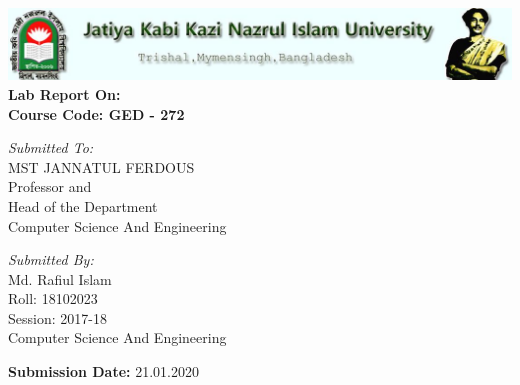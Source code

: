 \documentclass[12pt,a4paper]{report}
\begin{document}
	\begin{center}
		\includegraphics[width=\linewidth]{JKKNIU} \\
		\vspace{1cm}
		\large{ \textbf{Lab Report On: \\
				\color{blue}{Technical Writing And Presentation \\}
				\vspace{8mm}
				\color{black}Course Code: GED - 272}}
	\end{center}
	\vspace{8cm}
	\begin{minipage}{0.5\textwidth} 
		\huge{\textit{Submitted To: }} \\
		\large{MST JANNATUL FERDOUS} \\
		Professor and \\ Head of the Department \\
		Computer Science And Engineering
	\end{minipage}
	\begin{minipage}{0.5\textwidth} 
		\huge{\textit{Submitted By: }} \\
		\large{Md. Rafiul Islam} \\
		Roll: 18102023 \\
		Session: 2017-18 \\
		Computer Science And Engineering
	\end{minipage}
	\vspace{2cm}
	\begin{center}
		\textbf{Submission Date:} 21.01.2020
	\end{center}
\end{document}
